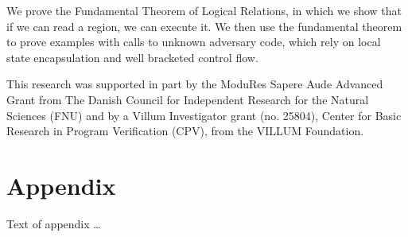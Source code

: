 \documentclass[sigplan,review]{acmart}\settopmatter{printfolios=true,printccs=false,printacmref=false}
\begin{document}



We prove the Fundamental Theorem of Logical Relations, in which we show that if we can read a region, we can execute it. We then use the fundamental theorem to prove examples with calls to unknown adversary code, which rely on local state encapsulation and well bracketed control flow. 

\begin{acks}                            %

  This research was supported in part by the ModuRes Sapere Aude Advanced Grant from The Danish Council for Independent Research for the Natural Sciences (FNU) and by a Villum Investigator grant (no.
  25804), Center for Basic Research in Program Verification (CPV), from the VILLUM Foundation.
  
\end{acks}





\appendix
\section{Appendix}

Text of appendix \ldots
\end{document}
